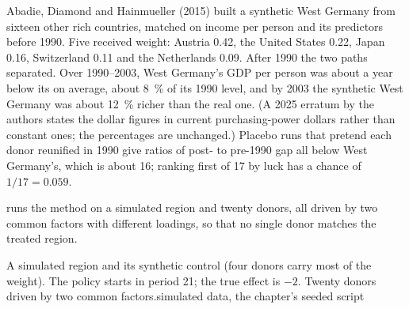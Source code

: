 \begin{record}
Abadie, Diamond and Hainmueller (2015) built a synthetic West Germany from
sixteen other rich countries, matched on income per person and its predictors
before 1990. Five received weight: Austria 0.42, the United States 0.22,
Japan 0.16, Switzerland 0.11 and the Netherlands 0.09. %
After 1990 the two paths separated. Over 1990--2003, West Germany's GDP per
person was about  a year below its  on average,
about 8~\% of its 1990 level, and by 2003 the synthetic West Germany was about
12~\% richer than the real one. %
(A 2025 erratum by the authors states the dollar figures in current
purchasing-power dollars rather than constant ones; the percentages are
unchanged.) Placebo runs that pretend each donor reunified in 1990 give
ratios of post- to pre-1990 gap all below West Germany's, which is about 16;
ranking first of 17 by luck has a chance of $1/17 = 0.059$. %
\end{record}

 runs the method on a simulated
region and twenty donors, all driven by two common factors with different
loadings, so that no single donor matches the treated region.

\label{lst:b3:difference-in-differences:synth}

\label{out:b3:difference-in-differences:synth}

\begin{omchart}{A simulated region and its synthetic control (four donors carry
most of the weight). The policy starts in period 21; the true effect is $-2$.
Twenty donors driven by two common factors.}{simulated data, the chapter's
seeded script}
\end{omchart}

